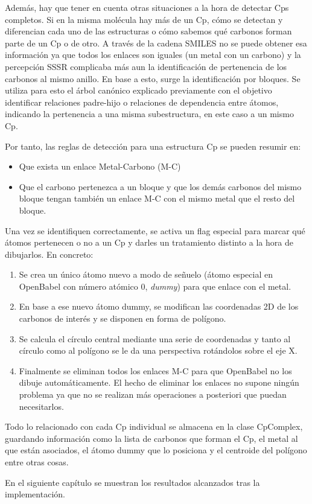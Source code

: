 Además, hay que tener en cuenta otras situaciones a la hora de detectar Cps completos. Si en la misma molécula hay más de un Cp, cómo se detectan y diferencian cada uno de las estructuras o cómo sabemos qué carbonos forman parte de un Cp o de otro. A través de la cadena SMILES no se puede obtener esa información ya que todos los enlaces son iguales (un metal con un carbono) y la percepción SSSR complicaba más aun la identificación de pertenencia de los carbonos al mismo anillo. En base a esto, surge la identificación por bloques. Se utiliza para esto el árbol canónico explicado previamente con el objetivo identificar relaciones padre-hijo o relaciones de dependencia entre átomos, indicando la pertenencia a una misma subestructura, en este caso a un mismo Cp.

Por tanto, las reglas de detección para una estructura Cp se pueden resumir en:
\begin{itemize}
    \item Que exista un enlace Metal-Carbono (M-C)
    \item Que el carbono pertenezca a un bloque y que los demás carbonos del mismo bloque tengan también un enlace M-C con el mismo metal que el resto del bloque.
\end{itemize}

Una vez se identifiquen correctamente, se activa un flag especial para marcar qué átomos pertenecen o no a un Cp y darles un tratamiento distinto a la hora de dibujarlos. En concreto:  
\begin{enumerate}
    \item Se crea un único átomo nuevo a modo de señuelo (átomo especial en OpenBabel con número atómico 0, \textit{dummy}) para que enlace con el metal.
    \item En base a ese nuevo átomo dummy, se modifican las coordenadas 2D de los carbonos de interés y se disponen en forma de polígono.
    \item Se calcula el círculo central mediante una serie de coordenadas y tanto al círculo como al polígono se le da una perspectiva rotándolos sobre el eje X.
    \item Finalmente se eliminan todos los enlaces M-C para que OpenBabel no los dibuje automáticamente. El hecho de eliminar los enlaces no supone ningún problema ya que no se realizan más operaciones a posteriori que puedan necesitarlos.
\end{enumerate} 

Todo lo relacionado con cada Cp individual se almacena en la clase CpComplex, guardando información como la lista de carbonos que forman el Cp, el metal al que están asociados, el átomo dummy que lo posiciona y el centroide del polígono entre otras cosas.

En el siguiente capítulo se muestran los resultados alcanzados tras la implementación.













